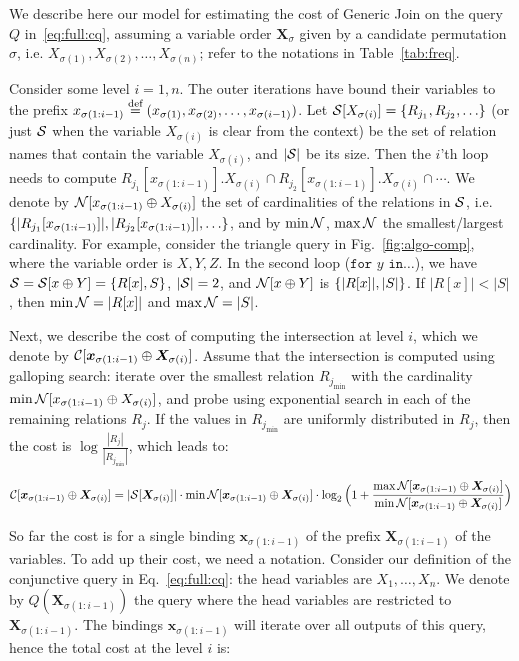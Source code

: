 We describe here our model for estimating the cost of Generic Join on the
query $Q$ in~\eqref{eq:full:cq}, assuming a variable order
$\bm X_\sigma$ given by a candidate permutation $\sigma$, i.e.
$X_{\sigma(1)}, X_{\sigma(2)}, \ldots, X_{\sigma(n)}$; refer to the
notations in Table~\ref{tab:freq}.  

Consider some level $i=1,n$.  The outer iterations have bound their
variables to the prefix
$x_{\sigma(1:i-1)}\stackrel{\text{def}}{=}
(x_{\sigma(1)},x_{\sigma(2)},\ldots,x_{\sigma(i-1)})$.  Let
$\mathcal{S}[X_{\sigma(i)}]=\{R_{j_1}, R_{j_2}, \ldots\}$ (or just $\mathcal{S}$
when the variable $X_{\sigma(i)}$ is clear from the context) be the
set of relation names that contain the variable $X_{\sigma(i)}$, and
$|\mathcal{S}|$ be its size. Then the $i$'th loop needs to compute
$R_{j_1}[x_{\sigma(1:i-1)}].X_{\sigma(i)} \cap
R_{j_2}[x_{\sigma(1:i-1)}].X_{\sigma(i)}\cap \cdots$.  We denote by
$\mathcal{N}[x_{\sigma(1:i-1)}\oplus X_{\sigma(i)}]$ the set of
cardinalities of the relations in $\mathcal{S}$, i.e.
$\{|R_{j_1}[x_{\sigma(1:i-1)}]|, |R_{j_2}[x_{\sigma(1:i-1)}]|,
  \ldots\}$, and by $\min \mathcal{N}$, $\max \mathcal{N}$ the smallest/largest
cardinality.  
For example, consider the triangle query in
Fig.~\ref{fig:algo-comp}, where the variable order is $X,Y,Z$.  In the
second loop ($\texttt{for } y \texttt{ in} \ldots$), we have
$\mathcal{S} = \mathcal{S}[x\oplus Y] = \{R[x], S\}$, $|\mathcal{S}|=2$, and
$\mathcal{N}[x\oplus Y]$ is $\{|R[x]|, |S|\}$. If $|R[x]| < |S|$, then $\min \mathcal{N} = |R[x]|$ and $\max \mathcal{N} = |S|$.

Next, we describe the cost of computing the intersection at level $i$,
which we denote by
${\mathcal{C}}[{{\bm{x}_{\sigma({1:i-1})}} \oplus {\bm{X}_{\sigma({i})}}}]$.  Assume that
the intersection is computed using galloping search: iterate over the
smallest relation $R_{j_{\min}}$ with the cardinality $\min \mathcal{N}[x_{\sigma(1:i-1)}\oplus X_{\sigma(i)}]$,  and probe using exponential search
in each of the remaining relations $R_j$.  If the values in
$R_{j_{\min}}$ are uniformly distributed in $R_j$, then the cost is
$\log\frac{|R_j|}{|R_{j_{\min}}|}$, which leads to:

\begin{equation*}
{\ensuremath{\mathcal{C}}}[{{\bm{x}_{\sigma({1:i-1})}} \oplus {\bm{X}_{\sigma({i})}}}] = |{\mathcal{S}}[{{\bm{X}_{\sigma({i})}}}]|\cdot \min {\ensuremath{\mathcal{N}}}[{{\bm{x}_{\sigma({1:i-1})}} \oplus {\bm{X}_{\sigma({i})}}}] \cdot \log_2\Big(1 + \frac{\max {\ensuremath{\mathcal{N}}}[{{\bm{x}_{\sigma({1:i-1})}} \oplus {\bm{X}_{\sigma({i})}}}]}{\min {\ensuremath{\mathcal{N}}}[{{\bm{x}_{\sigma({1:i-1})}} \oplus {\bm{X}_{\sigma({i})}}}]}\Big)
\end{equation*}

So far the cost is for a single binding $\bm x_{\sigma(1:i-1)}$ of the
prefix $\bm X_{\sigma(1:i-1)}$ of the variables.  To add up their
cost, we need a notation.  Consider our definition of the conjunctive
query in Eq.~\eqref{eq:full:cq}: the head variables are
$X_1, \ldots, X_n$.  We denote by $Q(\bm X_{\sigma(1:i-1)})$ the query
where the head variables are restricted to $\bm X_{\sigma(1:i-1)}$.
The bindings  $\bm x_{\sigma(1:i-1)}$ will iterate over all outputs of
this query, hence the total cost at the level $i$ is:

